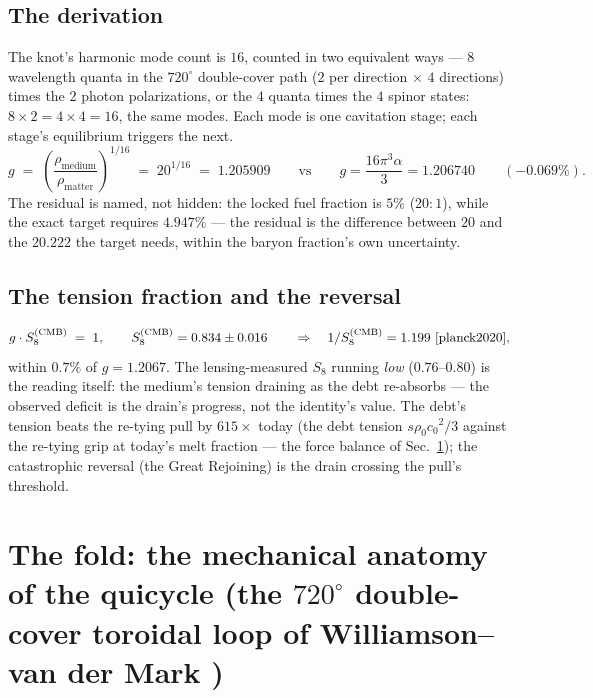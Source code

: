 \documentclass[11pt, a4paper]{article}
\newcommand{\cnot}{\ensuremath{c_0}}
\newcommand{\rhonot}{\ensuremath{\rho_0}}
\begin{document}
\subsection{The derivation}
The knot's harmonic mode count is $16$, counted in two equivalent ways ---
$8$ wavelength quanta in the $720^\circ$ double-cover path ($2$ per direction
$\times$ $4$ directions) times the $2$ photon polarizations, or the $4$ quanta
times the $4$ spinor states: $8\times2 = 4\times4 = 16$, the same modes. Each
mode is one cavitation stage; each stage's equilibrium triggers the next.
\begin{equation}
g \;=\; \left(\frac{\rho_{\mathrm{medium}}}{\rho_{\mathrm{matter}}}\right)^{1/16}
\;=\; 20^{1/16} \;=\; 1.205909
\qquad \text{vs}\qquad
g = \frac{16\pi^3\alpha}{3} = 1.206740
\qquad (-0.069\%).
\end{equation}
The residual is named, not hidden: the locked fuel fraction is $5\%$ ($20:1$),
while the exact target requires $4.947\%$ --- the residual is the difference
between $20$ and the $20.222$ the target needs, within the baryon fraction's
own uncertainty.

\subsection{The tension fraction and the reversal}
\begin{equation}
g \cdot S_8^{\mathrm{(CMB)}} \;=\; 1,
\qquad
S_8^{\mathrm{(CMB)}} = 0.834\pm0.016
\qquad \Rightarrow \quad 1/S_8^{\mathrm{(CMB)}} = 1.199
\ \text{\cite{planck2020}},
\end{equation}
within $0.7\%$ of $g = 1.2067$. The lensing-measured $S_8$ running \emph{low}
($0.76$--$0.80$) \cite{des2022} is the reading itself: the medium's tension
draining as the debt re-absorbs --- the observed deficit is the drain's
progress, not the identity's value. The debt's tension beats the re-tying pull by
$615\times$ today (the debt tension $s\rhonot\cnot^2/3$ against the re-tying grip
at today's melt fraction --- the force balance of Sec.~\ref{sec:fold}); the
catastrophic reversal (the Great Rejoining) is the drain
crossing the pull's threshold.

\section{The fold: the mechanical anatomy of the quicycle (the $720^\circ$
double-cover toroidal loop of Williamson--van der Mark \cite{williamson1997})}
\label{sec:fold}
\end{document}
